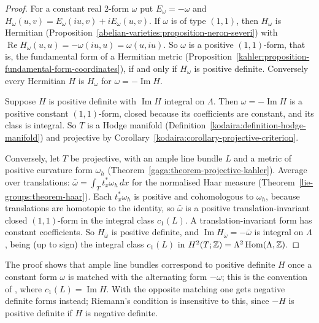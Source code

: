 \begin{proof}
For a constant real $2$-form $\omega$ put $E_\omega = -\omega$ and $H_\omega(u, v) = E_\omega(iu, v) + iE_\omega(u, v)$. If $\omega$ is of type $(1,1)$, then $H_\omega$ is Hermitian
(Proposition~\ref{abelian-varieties:proposition-neron-severi}) with $\operatorname{Re}H_\omega(u, u) = -\omega(iu, u) = \omega(u, iu)$. So $\omega$ is a positive $(1,1)$-form, that is, the
fundamental form of a Hermitian metric (Proposition~\ref{kahler:proposition-fundamental-form-coordinates}), if and only if $H_\omega$ is positive definite. Conversely every Hermitian $H$ is
$H_\omega$ for $\omega = -\operatorname{Im}H$.

Suppose $H$ is positive definite with $\operatorname{Im}H$ integral on $\Lambda$. Then $\omega = -\operatorname{Im}H$ is a positive constant $(1,1)$-form, closed because its coefficients
are constant, and its class is integral. So $T$ is a Hodge manifold (Definition~\ref{kodaira:definition-hodge-manifold}) and projective by
Corollary~\ref{kodaira:corollary-projective-criterion}.

Conversely, let $T$ be projective, with an ample line bundle $L$ and a metric of positive curvature form $\omega_h$ (Theorem~\ref{gaga:theorem-projective-kahler}). Average over translations:
$\bar\omega = \int_Tt_x^*\omega_h\,dx$ for the normalised Haar measure (Theorem~\ref{lie-groups:theorem-haar}). Each $t_x^*\omega_h$ is positive and cohomologous to $\omega_h$, because
translations are homotopic to the identity, so $\bar\omega$ is a positive translation-invariant closed $(1,1)$-form in the integral class $c_1(L)$. A translation-invariant form has constant
coefficients. So $H_{\bar\omega}$ is positive definite, and $\operatorname{Im}H_{\bar\omega} = -\bar\omega$ is integral on $\Lambda$, being (up to sign) the integral class $c_1(L)$ in
$H^2(T; \mathbb{Z}) = \Lambda^2\operatorname{Hom}(\Lambda, \mathbb{Z})$.
\end{proof}

\begin{remark}\label{abelian-varieties:remark-sign-convention}
The proof shows that ample line bundles correspond to positive definite $H$ once a constant form $\omega$ is matched with the alternating form $-\omega$; this is the convention of
\cite{birkenhake-lange}, where $c_1(L) = \operatorname{Im}H$. With the opposite matching one gets negative definite forms instead; Riemann's condition is insensitive to this, since
$-H$ is positive definite if $H$ is negative definite.
\end{remark}


